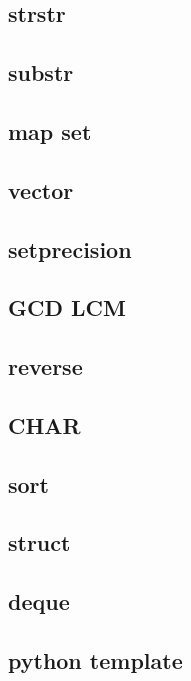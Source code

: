         \subsection{strstr}
                
        \subsection{substr}
                
        \subsection{map set}
                
        \subsection{vector}
                
        \subsection{setprecision}
                
        \subsection{GCD LCM}
                
        \subsection{reverse}
                
        \subsection{CHAR}
                
        \subsection{sort}
                
        \subsection{struct}
                
        \subsection{deque}
                
        \subsection{python template}
                    